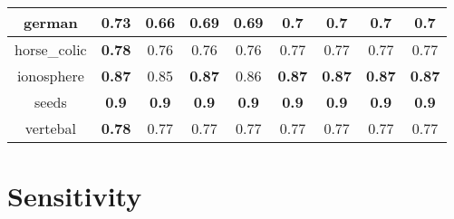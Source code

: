 \documentclass{article}%
\begin{document}
\begin{tabular}{c|cccccccc}
\hline%
german&\textbf{0.73}&0.66&0.69&0.69&0.7&0.7&0.7&0.7\\%
\hline%
horse\_colic&\textbf{0.78}&0.76&0.76&0.76&0.77&0.77&0.77&0.77\\%
\hline%
ionosphere&\textbf{0.87}&0.85&\textbf{0.87}&0.86&\textbf{0.87}&\textbf{0.87}&\textbf{0.87}&\textbf{0.87}\\%
\hline%
seeds&\textbf{0.9}&\textbf{0.9}&\textbf{0.9}&\textbf{0.9}&\textbf{0.9}&\textbf{0.9}&\textbf{0.9}&\textbf{0.9}\\%
\hline%
vertebal&\textbf{0.78}&0.77&0.77&0.77&0.77&0.77&0.77&0.77\\%
\hline%
\end{tabular}

%
\section*{Sensitivity}%
\end{document}
